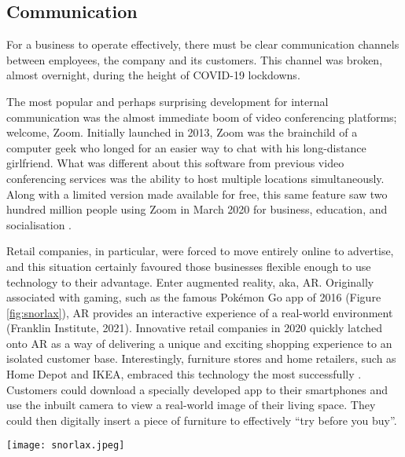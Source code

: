 \documentclass[a0,portrait]{a0poster}
\begin{document}
\begin{multicols}{2}
\subsection*{Communication}
For a business to operate effectively, there must be clear communication channels between employees, the company and its customers. This channel was broken, almost overnight, during the height of COVID-19 lockdowns. \par 
The most popular and perhaps surprising development for internal communication was the almost immediate boom of video conferencing platforms; welcome, Zoom. Initially launched in 2013, Zoom was the brainchild of a computer geek who longed for an easier way to chat with his long-distance girlfriend. What was different about this software from previous video conferencing services was the ability to host multiple locations simultaneously. Along with a limited version made available for free, this same feature saw two hundred million people using Zoom in March 2020 for business, education, and socialisation \cite{enssle}. \par 
Retail companies, in particular, were forced to move entirely online to advertise, and this situation certainly favoured those businesses flexible enough to use technology to their advantage. Enter augmented reality, aka, AR. Originally associated with gaming, such as the famous Pokémon Go app of 2016 (Figure \ref{fig:snorlax}), AR provides an interactive experience of a real-world environment (Franklin Institute, 2021). Innovative retail companies in 2020 quickly latched onto AR as a way of delivering a unique and exciting shopping experience to an isolated customer base. Interestingly, furniture stores and home retailers, such as Home Depot and IKEA, embraced this technology the most successfully \cite{mckinnon}. Customers could download a specially developed app to their smartphones and use the inbuilt camera to view a real-world image of their living space. They could then digitally insert a piece of furniture to effectively “try before you buy”. \par 

\begin{wraptable}{l}{12cm} %
\begin{center}
\texttt{[image: snorlax.jpeg]}
\label{fig:snorlax}
\end{center}
\end{wraptable}


\end{multicols}
\end{document}
